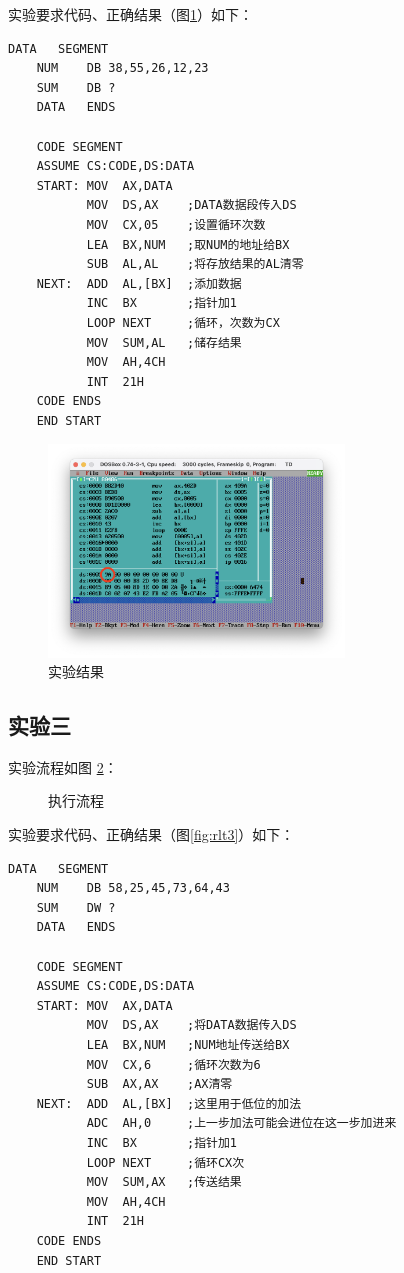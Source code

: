 \documentclass[11pt]{SEU-Digital-Report}
\begin{document}
实验要求代码、正确结果（图\ref{fig:rlt2}）如下：
\begin{lstlisting}[language={[x86masm]Assembler},title=exp32.asm]
    DATA   SEGMENT
    NUM    DB 38,55,26,12,23  
    SUM    DB ?
    DATA   ENDS

    CODE SEGMENT
    ASSUME CS:CODE,DS:DATA
    START: MOV  AX,DATA   
           MOV  DS,AX    ;DATA数据段传入DS
           MOV  CX,05    ;设置循环次数
           LEA  BX,NUM   ;取NUM的地址给BX
           SUB  AL,AL    ;将存放结果的AL清零
    NEXT:  ADD  AL,[BX]  ;添加数据
           INC  BX       ;指针加1
           LOOP NEXT     ;循环，次数为CX
           MOV  SUM,AL   ;储存结果
           MOV  AH,4CH
           INT  21H
    CODE ENDS
    END START
\end{lstlisting}

\begin{figure}[htbp]
    \centering
    \includegraphics[width=0.7\textwidth]{fig/rlt2.png}
    \caption{实验结果}
    \label{fig:rlt2}
\end{figure}

\subsection{实验三}
实验流程如图 \ref{fig:exp33}：
\begin{figure}[hbpt]
    \centering
    
    \caption{执行流程}
    \label{fig:exp33}
\end{figure}

实验要求代码、正确结果（图\ref{fig:rlt3}）如下：
\begin{lstlisting}[language={[x86masm]Assembler},title=exp33.asm]
    DATA   SEGMENT
    NUM    DB 58,25,45,73,64,43
    SUM    DW ?    
    DATA   ENDS

    CODE SEGMENT
    ASSUME CS:CODE,DS:DATA
    START: MOV  AX,DATA   
           MOV  DS,AX    ;将DATA数据传入DS
           LEA  BX,NUM   ;NUM地址传送给BX
           MOV  CX,6     ;循环次数为6
           SUB  AX,AX    ;AX清零
    NEXT:  ADD  AL,[BX]  ;这里用于低位的加法   
           ADC  AH,0     ;上一步加法可能会进位在这一步加进来
           INC  BX       ;指针加1
           LOOP NEXT     ;循环CX次
           MOV  SUM,AX   ;传送结果
           MOV  AH,4CH
           INT  21H
    CODE ENDS
    END START
\end{lstlisting}
\end{document}
